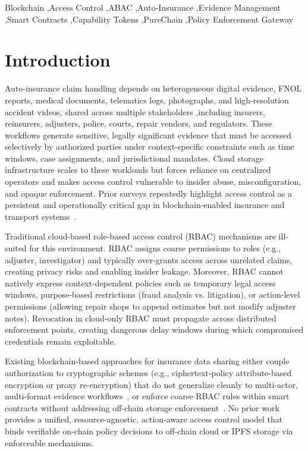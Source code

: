 \documentclass[final,5p,times,twocolumn]{elsarticle}
\begin{document}
\begin{frontmatter}
	\begin{keyword}
		Blockchain \sep Access Control \sep ABAC \sep Auto-Insurance \sep Evidence Management \sep Smart Contracts \sep Capability Tokens \sep PureChain \sep Policy Enforcement Gateway
	\end{keyword}

\end{frontmatter}

\section{Introduction}

Auto-insurance claim handling depends on heterogeneous digital evidence, FNOL reports, medical documents, telematics logs, photographs, and high-resolution accident videos, shared across multiple stakeholders ,including insurers, reinsurers, adjusters, police, courts, repair vendors, and regulators. These workflows generate sensitive, legally significant evidence that must be accessed selectively by authorized parties under context-specific constraints such as time windows, case assignments, and jurisdictional mandates. Cloud storage infrastructure scales to these workloads but forces reliance on centralized operators and makes access control vulnerable to insider abuse, misconfiguration, and opaque enforcement. Prior surveys repeatedly highlight access control as a persistent and operationally critical gap in blockchain-enabled insurance and transport systems~\cite{pournader2020blockchaininsurance, xu2021survey, yli2020blockchain, tarr2018insurance, wang2020secure}.

Traditional cloud-based role-based access control (RBAC) mechanisms are ill-suited for this environment. RBAC assigns coarse permissions to roles (e.g., adjuster, investigator) and typically over-grants access across unrelated claims, creating privacy risks and enabling insider leakage. Moreover, RBAC cannot natively express context-dependent policies such as temporary legal access windows, purpose-based restrictions (fraud analysis vs. litigation), or action-level permissions (allowing repair shops to append estimates but not modify adjuster notes). Revocation in cloud-only RBAC must propagate across distributed enforcement points, creating dangerous delay windows during which compromised credentials remain exploitable.

Existing blockchain-based approaches for insurance data sharing either couple authorization to cryptographic schemes (e.g., ciphertext-policy attribute-based encryption or proxy re-encryption) that do not generalize cleanly to multi-actor, multi-format evidence workflows~\cite{sun2020insurance, liu2021auto}, or enforce coarse RBAC rules within smart contracts without addressing off-chain storage enforcement~\cite{raikwar2018insurance, tekale2023claims, alwis2022decentralized, thukral2023vehicle, hombalimath2024vehicleclaim, raghav2024optimizing}. No prior work provides a unified, resource-agnostic, action-aware access control model that binds verifiable on-chain policy decisions to off-chain cloud or IPFS storage via enforceable mechanisms.
\end{document}
